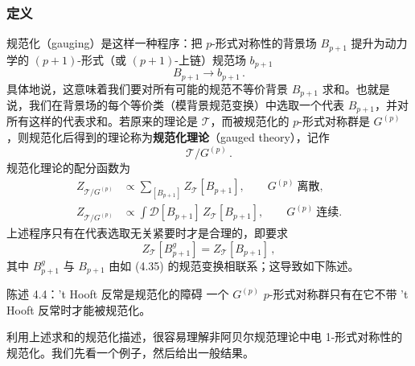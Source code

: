\subsubsection{定义}

规范化（gauging）是这样一种程序：把 $p$-形式对称性的背景场 $B_{p+1}$ 提升为动力学的 $(p+1)$-形式（或 $(p+1)$-上链）规范场 $b_{p+1}$
\begin{equation}
B_{p+1}\to b_{p+1}\,.
\tag{4.137}
\end{equation}
具体地说，这意味着我们要对所有可能的规范不等价背景 $B_{p+1}$ 求和。也就是说，我们在背景场的每个等价类（模背景规范变换）中选取一个代表 $B_{p+1}$，并对所有这样的代表求和。若原来的理论是 $\mathcal{T}$，而被规范化的 $p$-形式对称群是 $G^{(p)}$，则规范化后得到的理论称为\textbf{规范化理论}（gauged theory），记作
\begin{equation}
\mathcal{T}/G^{(p)}\,.
\tag{4.138}
\end{equation}
规范化理论的配分函数为
\begin{equation}
\begin{aligned}
Z_{\mathcal{T}/G^{(p)}}&\propto\sum_{[B_{p+1}]}Z_{\mathcal{T}}[B_{p+1}],\qquad G^{(p)}\ \text{离散},\\[2pt]
Z_{\mathcal{T}/G^{(p)}}&\propto\int\mathcal{D}[B_{p+1}]\,Z_{\mathcal{T}}[B_{p+1}],\qquad G^{(p)}\ \text{连续}.
\end{aligned}
\tag{4.139}
\end{equation}
上述程序只有在代表选取无关紧要时才是合理的，即要求
\begin{equation}
Z_{\mathcal{T}}[B^g_{p+1}]=Z_{\mathcal{T}}[B_{p+1}]\,,
\tag{4.140}
\end{equation}
其中 $B^g_{p+1}$ 与 $B_{p+1}$ 由如 (4.35) 的规范变换相联系；这导致如下陈述。

\begin{statementbox}{陈述 4.4：'t Hooft 反常是规范化的障碍}
一个 $G^{(p)}$ $p$-形式对称群只有在它不带 't Hooft 反常时才能被规范化。
\end{statementbox}


利用上述求和的规范化描述，很容易理解非阿贝尔规范理论中电 1-形式对称性的规范化。我们先看一个例子，然后给出一般结果。

